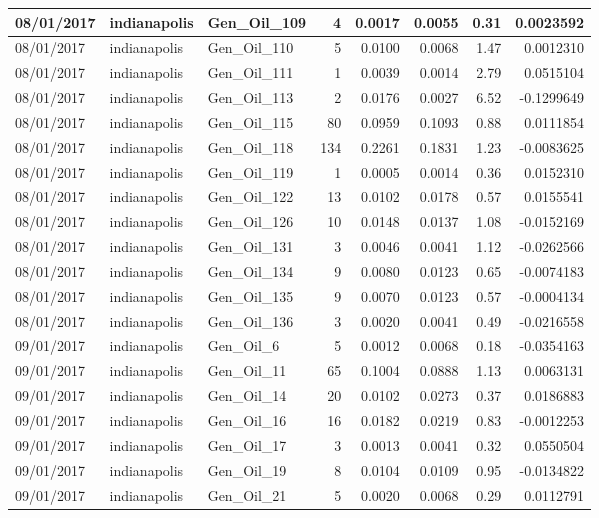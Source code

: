 \documentclass[
  letterpaper,
  DIV=11,
  numbers=noendperiod]{scrartcl}
\begin{document}
\begin{tabular}{l|l|l|r|r|r|r|r}
\hline
08/01/2017 & indianapolis & Gen\_Oil\_109 & 4 & 0.0017 & 0.0055 & 0.31 & 0.0023592\\
\hline
08/01/2017 & indianapolis & Gen\_Oil\_110 & 5 & 0.0100 & 0.0068 & 1.47 & 0.0012310\\
\hline
08/01/2017 & indianapolis & Gen\_Oil\_111 & 1 & 0.0039 & 0.0014 & 2.79 & 0.0515104\\
\hline
08/01/2017 & indianapolis & Gen\_Oil\_113 & 2 & 0.0176 & 0.0027 & 6.52 & -0.1299649\\
\hline
08/01/2017 & indianapolis & Gen\_Oil\_115 & 80 & 0.0959 & 0.1093 & 0.88 & 0.0111854\\
\hline
08/01/2017 & indianapolis & Gen\_Oil\_118 & 134 & 0.2261 & 0.1831 & 1.23 & -0.0083625\\
\hline
08/01/2017 & indianapolis & Gen\_Oil\_119 & 1 & 0.0005 & 0.0014 & 0.36 & 0.0152310\\
\hline
08/01/2017 & indianapolis & Gen\_Oil\_122 & 13 & 0.0102 & 0.0178 & 0.57 & 0.0155541\\
\hline
08/01/2017 & indianapolis & Gen\_Oil\_126 & 10 & 0.0148 & 0.0137 & 1.08 & -0.0152169\\
\hline
08/01/2017 & indianapolis & Gen\_Oil\_131 & 3 & 0.0046 & 0.0041 & 1.12 & -0.0262566\\
\hline
08/01/2017 & indianapolis & Gen\_Oil\_134 & 9 & 0.0080 & 0.0123 & 0.65 & -0.0074183\\
\hline
08/01/2017 & indianapolis & Gen\_Oil\_135 & 9 & 0.0070 & 0.0123 & 0.57 & -0.0004134\\
\hline
08/01/2017 & indianapolis & Gen\_Oil\_136 & 3 & 0.0020 & 0.0041 & 0.49 & -0.0216558\\
\hline
09/01/2017 & indianapolis & Gen\_Oil\_6 & 5 & 0.0012 & 0.0068 & 0.18 & -0.0354163\\
\hline
09/01/2017 & indianapolis & Gen\_Oil\_11 & 65 & 0.1004 & 0.0888 & 1.13 & 0.0063131\\
\hline
09/01/2017 & indianapolis & Gen\_Oil\_14 & 20 & 0.0102 & 0.0273 & 0.37 & 0.0186883\\
\hline
09/01/2017 & indianapolis & Gen\_Oil\_16 & 16 & 0.0182 & 0.0219 & 0.83 & -0.0012253\\
\hline
09/01/2017 & indianapolis & Gen\_Oil\_17 & 3 & 0.0013 & 0.0041 & 0.32 & 0.0550504\\
\hline
09/01/2017 & indianapolis & Gen\_Oil\_19 & 8 & 0.0104 & 0.0109 & 0.95 & -0.0134822\\
\hline
09/01/2017 & indianapolis & Gen\_Oil\_21 & 5 & 0.0020 & 0.0068 & 0.29 & 0.0112791\\

\end{tabular}
\end{document}
